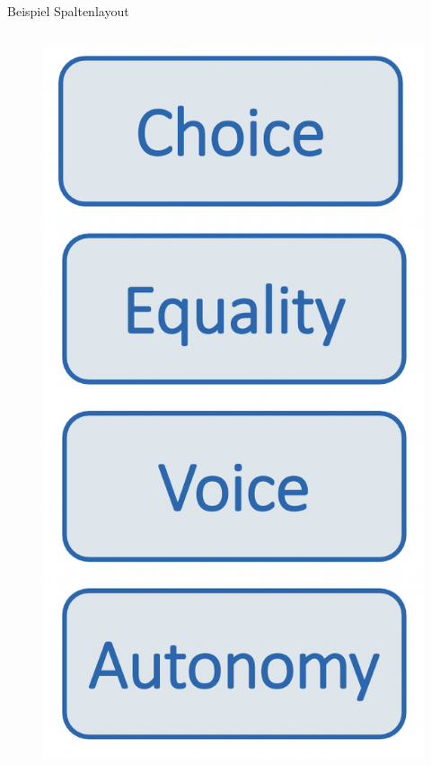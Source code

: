 \documentclass[11pt]{beamer}
\begin{document}
\begin{frame}{Beispiel Spaltenlayout}
	\begin{columns}
		\begin{column}{0.3\textwidth}
			\begin{figure}[ht]
				\includegraphics[width=\textwidth]{pics/s9-2.png}
			\end{figure}
		\end{column}

\end{columns}
\end{frame}
\end{document}
